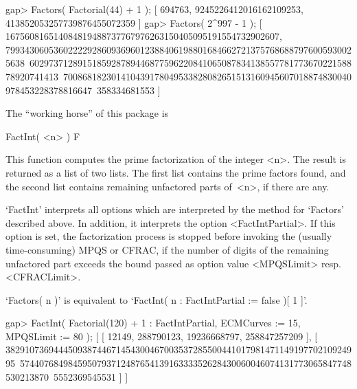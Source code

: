 \beginexample
gap> Factors( Factorial(44) + 1 );
[ 694763, 9245226412016162109253, 413852053257739876455072359 ]
gap> Factors( 2^997 - 1 );
[ 167560816514084819488737767976263150405095191554732902607,
  7993430605360222292860936960123884061988016846627213757686887976005930025638\
602973712891518592878944687759622084106508783413855778177367022158878920741413\
700868182301410439178049533828082651513160945607018874830040978453228378816647\
358334681553 ]
\endexample

The ``working horse'' of this package is


\>FactInt( <n> ) F

This function computes the prime factorization of the integer <n>.
The result is returned as a list of two lists. The first list
contains the prime factors found, and the second list contains remaining 
unfactored parts of~<n>, if there are any.

`FactInt' interprets all options which are interpreted by the method
for `Factors' described above. In addition, it interprets the option
<FactIntPartial>. If this option is set, the factorization process is
stopped before invoking the (usually time-consuming) MPQS or CFRAC,
if the number of digits of the remaining unfactored part exceeds the
bound passed as option value <MPQSLimit> resp. <CFRACLimit>.

`Factors( n )' is equivalent to
`FactInt( n : FactIntPartial := false )[ 1 ]'.

\beginexample
gap> FactInt( Factorial(120) + 1 : FactIntPartial, ECMCurves := 15, MPQSLimit := 80 );
[ [ 12149, 288790123, 19236668797, 258847257209 ], 
  [ 38291073694445093874467145430046700353728550044101798147114919770210924995\
574407684984595079371248765413916333352628430060046074131773065847748530213870\
5552369545531 ] ]
\endexample

